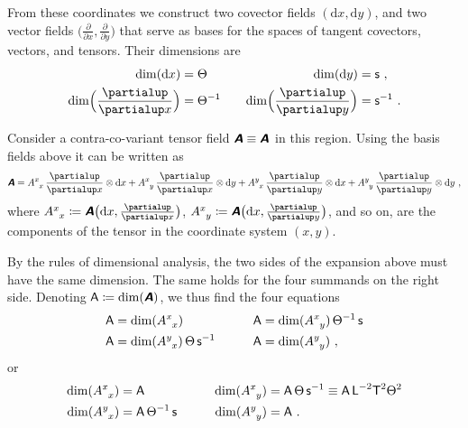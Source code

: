 \documentclass[\ifafour a4paper,12pt,\else a5paper,10pt,\fi%
onecolumn,oneside,article,%
british%
]{memoir}
\makeatletter
\theoremstyle{remark}
\theoremstyle{innote}
\newcommand*{\mathte}[1]{\textbf{\textit{\textsf{#1}}}}
\newcommand*{\de}{\partialup}%
\newcommand*{\di}{\mathrm{d}}%
\newcommand*{\defd}{\coloneqq}
\renewcommand*{\|}[1][]{\nonscript\,#1\vert\nonscript\;\mathopen{}}
\newcommand*{\q}{}%
\DeclareRobustCommand*{\q}{%
  \mathord{\mathpalette\bigcdot@{}}%
}
\newcommand*{\bigcdot@scalefactor}{0.7}
\newcommand*{\bigcdot@widthfactor}{1.5}
\newcommand*{\bigcdot@}[2]{%
  \sbox0{$#1\vcenter{}$}%
  \sbox2{$#1\cdot\m@th$}%
  \hbox to \bigcdot@widthfactor\wd2{%
    \hfil
    \raise\ht0\hbox{%
      \scalebox{\bigcdot@scalefactor}{%
        \lower\ht0\hbox{$#1\bullet\m@th$}%
      }%
    }%
    \hfil
  }%
}
\newcommand*{\Le}{\textsf{L}}
\newcommand*{\Ti}{\textsf{T}}
\newcommand*{\Te}{\Theta}
\newcommand*{\Ent}{\textsf{s}}
\newcommand*{\Aa}{\textsf{A}}
\newcommand*{\yA}{\mathte{A}}
\renewcommand*{\i}{\indices}
\makeatother
\begin{document}
From these coordinates we construct two covector fields $(\di x, \di y)$,
and two vector fields $\bigl(\frac{\de}{\de x}, \frac{\de}{\de y}\bigr)$
that serve as bases for the spaces of tangent covectors, vectors, and
tensors. Their dimensions are
\begin{equation}
  \label{eq:example_basisvects2d}
  \begin{aligned}
    \dim(\di x)&=\Te &\quad \dim(\di y)&= \Ent \ ,
    \\
    \dim\Bigl(\frac{\de}{\de x}\Bigr)&=\Te^{-1} &\quad \dim\Bigl(\frac{\de}{\de y}\Bigr)&= \Ent^{-1} \ .
  \end{aligned}
\end{equation}


Consider a contra-co-variant tensor field $\yA \equiv \yA\i{^{\q}_{\q}}$ in
this region. Using the basis fields above it can be written as
\begin{equation}
  \label{eq:expansion_tensor_2d}
  \yA = 
  A\i{^{x}_{x}}\,\frac{\de}{\de x} \otimes\di x + 
  A\i{^{x}_{y}}\,\frac{\de}{\de x} \otimes\di y + 
  A\i{^{y}_{x}}\,\frac{\de}{\de y} \otimes\di x + 
  A\i{^{y}_{y}}\,\frac{\de}{\de y} \otimes\di y \ ,
\end{equation}
where $A\i{^{x}_{x}} \defd \yA\bigl(\di x, \frac{\de}{\de x}\bigr)$,
$A\i{^{x}_{y}} \defd \yA\bigl(\di x, \frac{\de}{\de y}\bigr)$, and so on,
are the components of the tensor in the coordinate system $(x, y)$.

By the rules of dimensional analysis, the two sides of the expansion above
must have the same dimension. The same holds for the four summands on the
right side. Denoting $\Aa \defd \dim(\yA)$, we thus find the four equations
\begin{equation*}
  \label{eq:four_dims_2d_pre}
  \begin{aligned}
    \Aa &= \dim(A\i{^{x}_{x}}) &\qquad \Aa &=
 \dim(A\i{^{x}_{y}})\,\Te^{-1}\,\Ent 
 \\
    \Aa &= \dim(A\i{^{y}_{x}})\,\Te\,\Ent^{-1} &\qquad \Aa &=
 \dim(A\i{^{y}_{y}}) \ ,
  \end{aligned}
\end{equation*}
or
\begin{equation}
  \label{eq:four_dims_2d}
  \begin{aligned}
    \dim(A\i{^{x}_{x}}) &= \Aa &\qquad 
 \dim(A\i{^{x}_{y}}) &=\Aa\,\Te\,\Ent^{-1} \equiv
\Aa\,\Le^{-2}\Ti^{2}\Te^{2}
    \\
    \dim(A\i{^{y}_{x}}) &= \Aa\,\Te^{-1}\,\Ent &\qquad
 \dim(A\i{^{y}_{y}}) &= \Aa \ .
  \end{aligned}
\end{equation}
\end{document}
